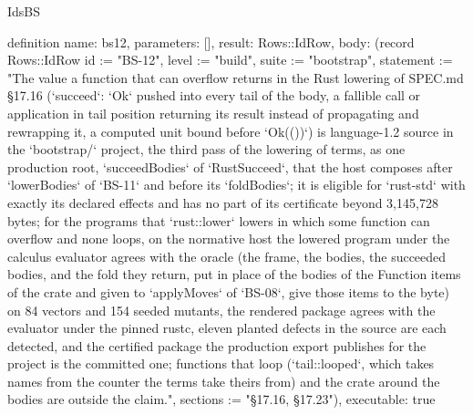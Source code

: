 \begin{lexlean}{IdsBS}
\begin{semanticmodule}
definition{
  name: bs12,
  parameters: [],
  result: Rows::IdRow,
  body: (record Rows::IdRow {id := "BS-12", level := "build", suite := "bootstrap", statement := "The value a function that can overflow returns in the Rust lowering of SPEC.md §17.16 (`succeed`: `Ok` pushed into every tail of the body, a fallible call or application in tail position returning its result instead of propagating and rewrapping it, a computed unit bound before `Ok(())`) is language-1.2 source in the `bootstrap/` project, the third pass of the lowering of terms, as one production root, `succeedBodies` of `RustSucceed`, that the host composes after `lowerBodies` of `BS-11` and before its `foldBodies`; it is eligible for `rust-std` with exactly its declared effects and has no part of its certificate beyond 3,145,728 bytes; for the programs that `rust::lower` lowers in which some function can overflow and none loops, on the normative host the lowered program under the calculus evaluator agrees with the oracle (the frame, the bodies, the succeeded bodies, and the fold they return, put in place of the bodies of the Function items of the crate and given to `applyMoves` of `BS-08`, give those items to the byte) on 84 vectors and 154 seeded mutants, the rendered package agrees with the evaluator under the pinned rustc, eleven planted defects in the source are each detected, and the certified package the production export publishes for the project is the committed one; functions that loop (`tail::looped`, which takes names from the counter the terms take theirs from) and the crate around the bodies are outside the claim.", sections := "§17.16, §17.23"}),
  executable: true
}


\end{semanticmodule}
\end{lexlean}
